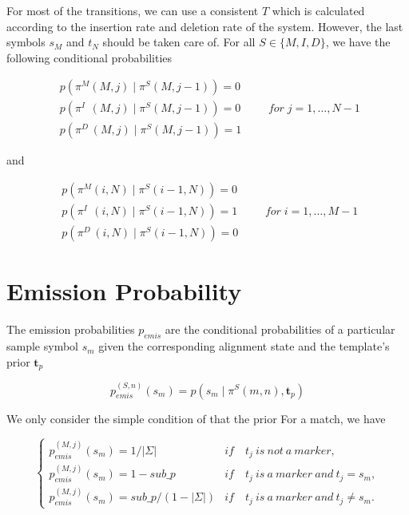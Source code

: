 \documentclass[10pt]{article}
\begin{document}
  For most of the transitions, we can use a consistent $T$ which is calculated according to the insertion rate and deletion rate of the system. However, the last symbols $s_M$ and $t_N$ should be taken care of. For all $S \in \{M, I, D\}$, we have the following conditional probabilities
  
  \begin{equation} \label{eq002}
    \begin{aligned}
      p\left(\pi^{M}(M, j) \;|\; \pi^{S}(M, j-1)\right) = 0 \\
      p\left(\pi^{I\;\;}(M, j) \;|\; \pi^{S}(M, j-1)\right) = 0 \\
      p\left(\pi^{D\;}(M, j) \;|\; \pi^{S}(M, j-1)\right) = 1
    \end{aligned} \qquad for\; j=1,\dots,N-1
  \end{equation}

  and

  \begin{equation} \label{eq003}
    \begin{aligned}
      p\left(\pi^{M}(i, N) \;|\; \pi^{S}(i-1, N)\right) = 0 \\
      p\left(\pi^{I\;\;}(i, N) \;|\; \pi^{S}(i-1,N)\right) = 1\\
      p\left(\pi^{D\;}(i, N) \;|\; \pi^{S}(i-1, N)\right) = 0
    \end{aligned} \qquad for\; i=1,\dots,M-1
  \end{equation}

\section{Emission Probability}

  The emission probabilities $p_{emis}$ are the conditional probabilities of a particular sample symbol $s_m$ given the corresponding alignment state and the template's prior $\mathbf{t}_p$

  \begin{equation}
    p_{emis}^{(S, n)}(s_m) = p\left(s_m \;|\; \pi^S(m, n), \mathbf{t}_p\right)
  \end{equation}

  We only consider the simple condition of  that the prior For a match, we have

  \begin{equation}
    \begin{cases}
      p_{emis}^{(M, j)}(s_m) = 1 / |\Sigma|        &if \quad t_j\ is\ not\ a\ marker, \\
      p_{emis}^{(M, j)}(s_m) = 1 - sub\_p          &if \quad t_j\ is\ a\ marker\ and\ t_j = s_m, \\
      p_{emis}^{(M, j)}(s_m) = sub\_p/(1-|\Sigma|) &if \quad t_j\ is\ a\ marker\ and\ t_j \neq s_m.
      
    \end{cases}
  \end{equation}
\end{document}
